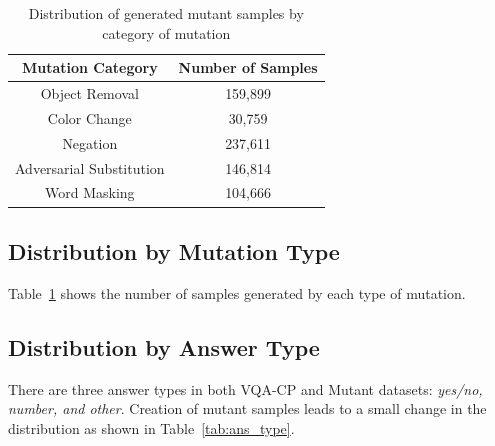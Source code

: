         \begin{table}[t]
    \centering
    \small
    \begin{tabular}{@{}cc@{}}
        \toprule
        \textbf{Mutation Category} & \textbf{Number of Samples}\\
        \toprule
        Object Removal  & 159,899\\
        Color Change    & 30,759 \\
        Negation        & 237,611 \\
        Adversarial Substitution & 146,814 \\
        Word Masking & 104,666\\
        \bottomrule
    \end{tabular}

    \caption{Distribution of generated mutant samples by category of mutation}
    \label{tab:mutant_type}
\end{table}



    \subsection{Distribution by Mutation Type}
    Table~\ref{tab:mutant_type} shows the number of samples generated by each type of mutation.

    
    \subsection{Distribution by Answer Type}
    There are three answer types in both VQA-CP and Mutant datasets: \textit{yes/no, number, and other}.
    Creation of mutant samples leads to a small change in the distribution as shown in Table~\ref{tab:ans_type}.
